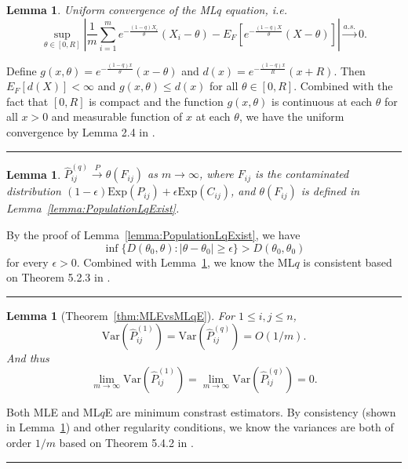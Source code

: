 \documentclass[a4paper]{article}
\newenvironment{proof}{{\bf Proof:  }}{\hfill\rule{2mm}{2mm}}
\newtheorem{lemma}[fact]{Lemma}
\renewcommand{\hat}{\widehat}
\begin{document}
\begin{lemma}
\label{lemma:UniformConvergence}
Uniform convergence of the MLq equation, i.e.\ 
\[
	\sup_{\theta \in [0, R]} \left| \frac{1}{m} \sum_{i=1}^m e^{-\frac{(1-q) X_i}{\theta}}(X_i - \theta) - E_F[e^{-\frac{(1-q) X}{\theta}}(X - \theta)] \right| \stackrel{a.s.}{\to} 0.
\]
\end{lemma}
\begin{proof}
Define $g(x,\theta) = e^{-\frac{(1-q) x}{\theta}}(x - \theta)$ and $d(x) = e^{-\frac{(1-q)x}{R}}(x + R)$. Then $E_F[d(X)] < \infty$ and $g(x,\theta) \le d(x)$ for all $\theta \in [0, R]$.
Combined with the fact that $[0, R]$ is compact and the function $g(x,\theta)$ is continuous at each $\theta$ for all $x > 0$ and measurable function of $x$ at each $\theta$, we have the uniform convergence by Lemma 2.4 in \citep{newey1994large}.
\end{proof}

\begin{lemma}
\label{lemma:ELqConverge}
$\hat{P}_{ij}^{(q)} \stackrel{P}{\to} \theta(F_{ij})$ as $m \to \infty$, where $F_{ij}$ is the contaminated distribution $(1-\epsilon) \mathrm{Exp}(P_{ij}) + \epsilon \mathrm{Exp}(C_{ij})$, and $ \theta(F_{ij})$ is defined in Lemma~\ref{lemma:PopulationLqExist}. 
\end{lemma}
\begin{proof}
By the proof of Lemma~\ref{lemma:PopulationLqExist}, we have
\[
	\inf\{D(\theta_0, \theta): |\theta - \theta_0| \ge \epsilon \} > D(\theta_0, \theta_0)
\]
for every $\epsilon > 0$. Combined with Lemma~\ref{lemma:UniformConvergence}, we know the ML$q$ is consistent based on Theorem 5.2.3 in \citep{bickel2007mathematical}.
\end{proof}

\begin{lemma}[Theorem~\ref{thm:MLEvsMLqE}]
\label{lemma:VarLqlVarMLEproof}
For $1 \le i, j \le n$, 
\[
	\mathrm{Var}(\hat{P}^{(1)}_{ij})
    = \mathrm{Var}(\hat{P}^{(q)}_{ij}) = O(1/m).
\]
And thus
\[
	\lim_{m \to \infty} \mathrm{Var}(\hat{P}^{(1)}_{ij})
    = \lim_{m \to \infty} \mathrm{Var}(\hat{P}^{(q)}_{ij}) = 0.
\]
\end{lemma}
\begin{proof}
Both MLE and ML$q$E are minimum constrast estimators. By consistency (shown in Lemma~\ref{lemma:ELqConverge}) and other regularity conditions, we know the variances are both of order $1/m$ based on Theorem 5.4.2 in \citep{bickel2007mathematical}.
\end{proof}
\end{document}

